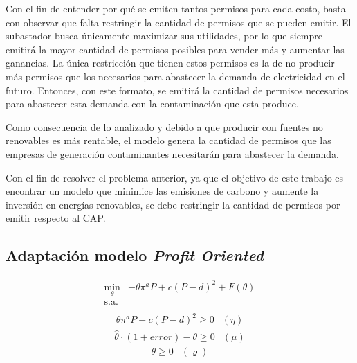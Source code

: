 Con el fin de entender por qué se emiten tantos permisos para cada costo, basta con observar que falta restringir la cantidad de permisos que se pueden emitir. El subastador busca únicamente maximizar sus utilidades, por lo que siempre emitirá la mayor cantidad de permisos posibles para vender más y aumentar las ganancias. La única restricción que tienen estos permisos es la de no producir más permisos que los necesarios para abastecer la demanda de electricidad en el futuro. Entonces, con este formato, se emitirá la cantidad de permisos necesarios para abastecer esta demanda con la contaminación que esta produce.
\vspace{2.5mm}

Como consecuencia de lo analizado y debido a que producir con fuentes no renovables es más rentable, el modelo genera la cantidad de permisos que las empresas de generación contaminantes necesitarán para abastecer la demanda. 
\vspace{2.5mm}

Con el fin de resolver el problema anterior, ya que el objetivo de este trabajo es encontrar un modelo que minimice las emisiones de carbono y aumente la inversión en energías renovables, se debe restringir la cantidad de permisos por emitir respecto al CAP.

\subsection{Adaptación modelo \textit{Profit Oriented}}

\begin{footnotesize}
\begin{equation}
\begin{array}{rrclcl}
   \displaystyle \min_{\theta} & -\theta \pi^aP + c(P-d)^2+F(\theta) \\\textrm{s.a.} \label{eq:profit2}\\
\end{array}
\end{equation}
\begin{equation}
\begin{array}{cl}
    \theta \pi^a P - c(P-d)^2 \geq 0 & (\eta)  \label{profit2:r1}
\end{array}
\end{equation}
\begin{equation}
\begin{array}{cl}
    \hat{\theta}\cdot(1+error)-\theta \geq 0 & (\mu)  \label{profit2:r2}
\end{array}
\end{equation}
\begin{equation}
\begin{array}{cl}
    \theta \geq 0 & (\varrho)
\end{array}
\end{equation}
\end{footnotesize}

